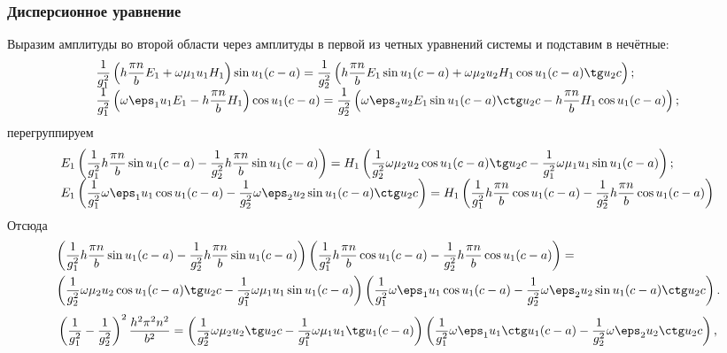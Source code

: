 \subsubsection{Дисперсионное уравнение}
Выразим амплитуды во второй области через амплитуды в первой из четных уравнений
системы и подставим в нечётные:
\begin{equation}
\begin{array}{l}
    \frac{1}{g_1^2} \left(h \frac{\pi n}{b} E_1 + \omega\mu_1u_1H_1\right)
    \sin u_1 (c-a) =  \frac{1}{g_2^2}
    \left(h \frac{\pi n}{b} E_1 \sin u_1(c-a) +
    \omega\mu_2u_2H_1\cos u_1 (c-a) \tg u_2 c \right) ;\\
    \frac{1}{g_1^2}\left(\omega\eps_1u_1E_1-h \frac{\pi n}{b} H_1\right)
    \cos u_1 (c-a) = \frac{1}{g_2^2}
    \left(\omega\eps_2u_2E_1\sin u_1(c-a)\ctg u_2 c-
    h \frac{\pi n}{b} H_1\cos u_1 (c-a)\right) ;\\
\end{array}
    \label{eq:fast_waves_relations}
\end{equation}
перегруппируем
\[
\begin{array}{l}
    E_1\left(\frac{1}{g_1^2} h \frac{\pi n}{b}\sin u_1 (c-a) -
    \frac{1}{g_2^2}h \frac{\pi n}{b}\sin u_1(c-a)\right) =
    H_1\left(\frac{1}{g_2^2}\omega\mu_2u_2\cos u_1 (c-a) \tg u_2 c-
    \frac{1}{g_1^2}\omega\mu_1u_1\sin u_1 (c-a)\right);\\
    E_1\left(\frac{1}{g_1^2}\omega\eps_1u_1\cos u_1 (c-a)-
    \frac{1}{g_2^2}\omega\eps_2u_2\sin u_1(c-a)\ctg u_2 c\right)=
    H_1\left(\frac{1}{g_1^2}h \frac{\pi n}{b} \cos u_1 (c-a)-
    \frac{1}{g_2^2}h \frac{\pi n}{b} \cos u_1 (c-a)\right)
\end{array}
\]
Отсюда
\begin{align*}
    &\left(\frac{1}{g_1^2} h \frac{\pi n}{b}\sin u_1 (c-a) -
    \frac{1}{g_2^2}h \frac{\pi n}{b}\sin u_1(c-a)\right)\left(\frac{1}{g_1^2}h \frac{\pi n}{b} \cos u_1 (c-a)-
    \frac{1}{g_2^2}h \frac{\pi n}{b} \cos u_1 (c-a)\right) =\\
    & \left(\frac{1}{g_2^2}\omega\mu_2u_2\cos u_1 (c-a) \tg u_2 c-
    \frac{1}{g_1^2}\omega\mu_1u_1\sin u_1 (c-a)\right)
    \left(\frac{1}{g_1^2}\omega\eps_1u_1\cos u_1 (c-a)-
    \frac{1}{g_2^2}\omega\eps_2u_2\sin u_1(c-a)\ctg u_2 c\right).
\end{align*}
\[
    \left( \frac{1}{g_1^2} - \frac{1}{g_2^2} \right)^2\frac{h^2\pi^2n^2}{b^2}=
    \left(\frac{1}{g_2^2}\omega\mu_2u_2\tg u_2 c-
    \frac{1}{g_1^2}\omega\mu_1u_1\tg u_1 (c-a)\right)
    \left(\frac{1}{g_1^2}\omega\eps_1u_1\ctg u_1 (c-a)-
    \frac{1}{g_2^2}\omega\eps_2u_2\ctg u_2 c\right),
\]
